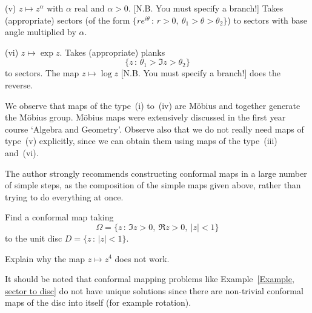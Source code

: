 (v) $z\mapsto z^{\alpha}$ with $\alpha$ real and $\alpha>0$.
[N.B. You must specify a branch!] 
Takes (appropriate) sectors
(of the form $\{re^{i\theta}\,:\,r>0,\ \theta_{1}>\theta>\theta_{2}\}$)
to sectors with base angle multiplied by $\alpha$. 

(vi) $z\mapsto \exp z$. Takes (appropriate) planks
\[\{z\,:\, \theta_{1}>\Im z>\theta_{2}\}\]
to sectors. The map $z\mapsto\log z$
[N.B. You must specify a branch!] does the reverse.

We observe that maps of the type~(i) to~(iv) are M\"{o}bius
and together generate the M\"{o}bius group. 
M\"{o}bius maps were extensively discussed in the
first year course `Algebra and Geometry'.
Observe also
that we do not really need maps of type~(v) explicitly,
since we can obtain them using maps of the type~(iii)
and~(vi).

The author strongly recommends constructing conformal
maps in a large number of simple steps, as the composition
of the simple maps given above, rather than trying to
do everything at once.
\begin{example}\label{Example, sector to disc}
Find a conformal map taking
\[\Omega=\{z\,:\,\Im z>0,\ \Re z>0,\ |z|<1\}\]
to the unit disc $D=\{z\,:\, |z|<1\}$.

Explain why the map $z\mapsto z^{4}$ does not work.
\end{example}
It should be noted that conformal mapping problems like 
Example~\ref{Example, sector to disc}  do not have
unique solutions since there are non-trivial conformal
maps of the disc into itself (for example rotation).

